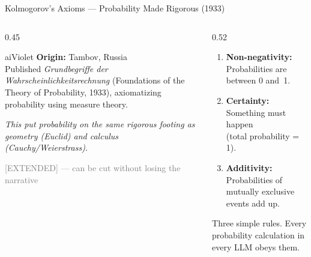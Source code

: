 \begin{frame}{Kolmogorov's Axioms --- Probability Made Rigorous (1933)}

  \begin{columns}[T]
    \begin{column}{0.45\textwidth}
      \begin{personbox}{aiViolet}
        \textbf{Origin:} Tambov, Russia\\[3pt]
        Published \emph{Grundbegriffe der Wahrscheinlichkeitsrechnung}
        (Foundations of the Theory of Probability, 1933), axiomatizing
        probability using measure theory.
      \end{personbox}

      \vspace{0.3em}
      {\small\itshape This put probability on the same rigorous footing
      as geometry (Euclid) and calculus (Cauchy/Weierstrass).}

      \vspace{0.3em}
      {\footnotesize\textcolor{gray}{[EXTENDED] --- can be cut without
      losing the narrative}}
    \end{column}

    \begin{column}{0.52\textwidth}
      \begin{tcolorbox}[colback=aiViolet!5, colframe=aiViolet,
        fonttitle=\bfseries, title={Kolmogorov's Three Axioms},
        rounded corners, boxrule=1pt, left=4pt, right=4pt, top=3pt, bottom=3pt]
        \begin{enumerate}\setlength\itemsep{6pt}
          \item \textbf{Non-negativity:} Probabilities are between 0 and~1.
          \item \textbf{Certainty:} Something must happen\\
                (total probability = 1).
          \item \textbf{Additivity:} Probabilities of mutually exclusive
                events add up.
        \end{enumerate}
      \end{tcolorbox}

      \vspace{0.4em}
      {\small\centering Three simple rules. Every probability calculation
      in every LLM obeys them.\par}
    \end{column}
  \end{columns}

\end{frame}

